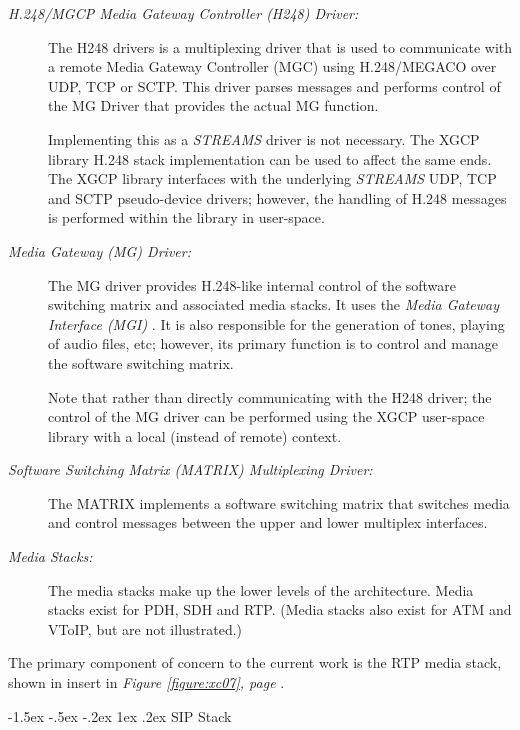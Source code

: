 \documentclass[letterpaper,final,notitlepage,twocolumn,10pt,twoside]{article}
\makeatletter
\let\normalsize = \small
\let\small = \footnotesize
\let\footnotesize = \scriptsize
\let\scriptsize = \tiny
\renewcommand\subsection{\@startsection{subsection}{2}{\z@}%
                                     {-1.5ex \@plus -.5ex \@minus -.2ex}%
                                     {1ex \@plus .2ex}%
                                     {\normalfont\normalsize\bfseries}}
\makeatother
\begin{document}
\begin{description}

\item[{\it H.248/MGCP Media Gateway Controller (H248) Driver:}] The H248
drivers is a multiplexing driver that is used to communicate with a remote
Media Gateway Controller (MGC) using H.248/MEGACO over UDP, TCP or SCTP.  This
driver parses messages and performs control of the MG Driver that provides the
actual MG function.

Implementing this as a {\sl STREAMS} driver is not necessary.  The XGCP
library H.248 stack implementation can be used to affect the same ends.  The
XGCP library interfaces with the underlying {\sl STREAMS} UDP, TCP and SCTP
pseudo-device drivers; however, the handling of H.248 messages is performed
within the library in user-space.

\item[{\it Media Gateway (MG) Driver:}]  The MG driver provides H.248-like
internal control of the software switching matrix and associated media stacks.
It uses the {\sl Media Gateway Interface (MGI)} \cite{MGI}.  It is also
responsible for the generation of tones, playing of audio files, etc; however,
its primary function is to control and manage the software switching
matrix.

Note that rather than directly communicating with the H248 driver; the control
of the MG driver can be performed using the XGCP user-space library with a
local (instead of remote) context.

\item[{\it Software Switching Matrix (MATRIX) Multiplexing Driver:}]  The
MATRIX implements a software switching matrix that switches media and control
messages between the upper and lower multiplex interfaces.

\item[{\it Media Stacks:}]  The media stacks make up the lower levels of the
architecture.  Media stacks exist for PDH, SDH and RTP.  (Media stacks also
exist for ATM and VToIP, but are not illustrated.)

\end{description}

The primary component of concern to the current work is the RTP media stack,
shown in insert in {\sl Figure \ref{figure:xc07}, page \pageref{figure:xc07}}.

\subsection{SIP Stack}
\end{document}
